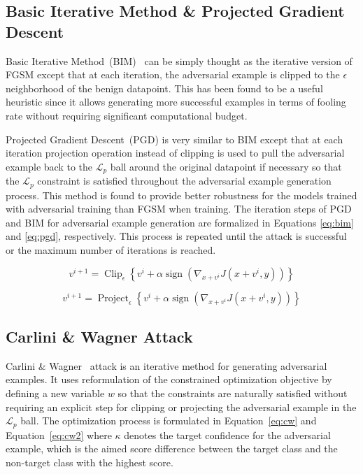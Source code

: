 \subsection{Basic Iterative Method \& Projected Gradient Descent}
Basic Iterative Method~(BIM)~\cite{kurakin2018adversarialphys} can be simply thought as the iterative version of FGSM except that at each iteration, the adversarial example is clipped to the \(\epsilon\) neighborhood of the benign datapoint. This has been found to be a useful heuristic since it allows generating more successful examples in terms of fooling rate without requiring significant computational budget.

Projected Gradient Descent~(PGD) \cite{madry2017towards} is very similar to BIM except that at each iteration projection operation instead of clipping is used to pull the adversarial example back to the \(\mathcal{L}_p\) ball around the original datapoint if necessary so that the \(\mathcal{L}_p\) constraint is satisfied throughout the adversarial example generation process. This method is found to provide better robustness for the models trained with adversarial training than FGSM when training. The iteration steps of PGD and BIM for adversarial example generation are formalized in Equations \ref{eq:bim} and \ref{eq:pgd}, respectively. This process is repeated until the attack is successful or the maximum number of iterations is reached.

\begin{equation}
    \label{eq:bim}
    v^{i+1}=\operatorname{Clip}_{\epsilon}\left\{v^{i}+\alpha \operatorname{sign}\left(\nabla_{x+v^{i}} J\left(x+v^{i}, y\right)\right)\right\}
\end{equation}

\begin{equation}
    \label{eq:pgd}
    v^{i+1}=\operatorname{Project}_{\epsilon}\left\{v^{i}+\alpha \operatorname{sign}\left(\nabla_{x+v^{i}} J\left(x+v^{i}, y\right)\right)\right\}
\end{equation}


\subsection{Carlini \& Wagner Attack}
Carlini \& Wagner~\cite{carlini2017towards} attack is an iterative method for generating adversarial examples. It uses reformulation of the constrained optimization objective by defining a new variable \(w\) so that the constraints are naturally satisfied without requiring an explicit step for clipping or projecting the adversarial example in the \(\mathcal{L}_p\) ball. The optimization process is formulated in Equation~\ref{eq:cw} and Equation~\ref{eq:cw2} where \(\kappa\) denotes the target confidence for the adversarial example, which is the aimed score difference between the target class and the non-target class with the highest score.

